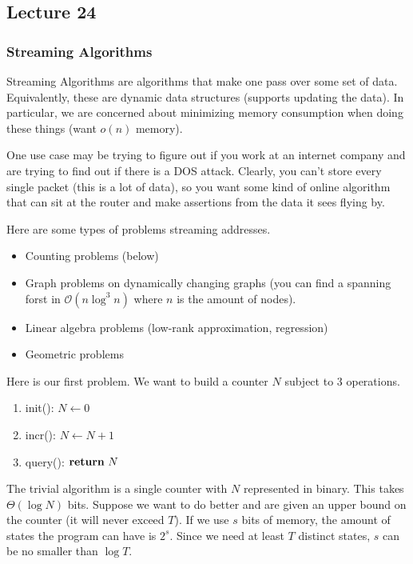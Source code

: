 \subsection{Lecture 24}
\subsubsection{Streaming Algorithms}

\begin{definition}
    Streaming Algorithms are algorithms that make one pass over some set of data. Equivalently, these are dynamic data structures (supports updating the data).
    In particular, we are concerned about minimizing memory consumption when doing these things (want $o(n)$ memory).
\end{definition}

One use case may be trying to figure out if you work at an internet company and are trying to find out if there is a DOS attack.
Clearly, you can't store every single packet (this is a lot of data), so you want some kind of online algorithm that can sit at the router and make
assertions from the data it sees flying by.

Here are some types of problems streaming addresses.
\begin{itemize}
    \item Counting problems (below)
    \item Graph problems on dynamically changing graphs (you can find a spanning forst in $\mathcal{O}(n \log^3 n)$ where $n$ is the amount of nodes).
    \item Linear algebra problems (low-rank approximation, regression)
    \item Geometric problems
\end{itemize}

Here is our first problem. We want to build a counter $N$ subject to 3 operations.
\begin{enumerate}
    \item init(): $N \gets 0$
    \item incr(): $N \gets N + 1$
    \item query(): $\Return \text{ } N$
\end{enumerate}

The trivial algorithm is a single counter with $N$ represented in binary. This takes $\Theta(\log N)$ bits. Suppose we want to do better and are given an upper bound on the counter (it will never exceed $T$).
If we use $s$ bits of memory, the amount of states the program can have is $2^s$. Since we need at least $T$ distinct states, $s$ can be no smaller than $\log T$.


